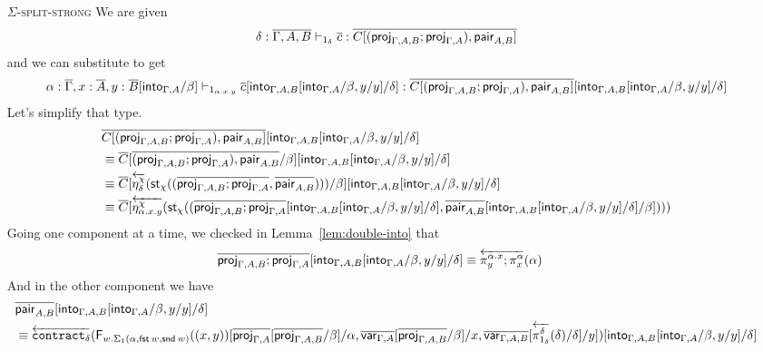 \documentclass[10pt]{article}
\theoremstyle{definition}
\newcommand\dsd[1]{\ensuremath{\mathsf{#1}}}
\newcommand{\yields}{\vdash}
\newcommand{\app}[2]{\ensuremath{#1 \: #2}}
\newcommand{\fst}[1]{\app{\dsd{fst}}{#1}}
\newcommand{\snd}[1]{\app{\dsd{snd}}{#1}}
\newcommand{\rewrite}[2]{\overleftarrow{#1}(#2)}
\newcommand\StI[2]{\ensuremath{\mathsf{st}_{#1}(#2)}}
\newcommand\FIs[2]{\ensuremath{\mathsf{F}_{#1}{(#2)}}}
\begin{document}
\begin{enumerate}[style = multiline, labelwidth = 80pt]
\item[\textsc{$\Sigma$-split-strong}] We are given
\begin{align*}
\delta : \upstairs{\Gamma, A, B} \yields_{1_\delta} \upstairs{c} :\upstairs{C[(\proj{\Gamma, A, B};\proj{\Gamma, A}), \qpair{A,B}]} 
\end{align*}
and we can substitute to get
\begin{align*}
\alpha : \upstairs{\Gamma}, x : \upstairs{A}, y : \upstairs{B}[\into{\Gamma,A}/\beta] \yields_{1_{\alpha.x.y}} \upstairs{c}[\into{\Gamma, A, B}[\into{\Gamma, A}/\beta, y/y] /\delta] : \upstairs{C[(\proj{\Gamma, A, B};\proj{\Gamma, A}), \qpair{A,B}]}[\into{\Gamma, A, B}[\into{\Gamma, A}/\beta, y/y] /\delta]
\end{align*}
Let's simplify that type.
\begin{align*}
&\upstairs{C[(\proj{\Gamma, A, B};\proj{\Gamma, A}), \qpair{A,B}]}[\into{\Gamma, A, B}[\into{\Gamma, A}/\beta, y/y] /\delta] \\
&\equiv \upstairs{C}[\upstairs{(\proj{\Gamma, A, B};\proj{\Gamma, A}), \qpair{A,B}}/\beta][\into{\Gamma, A, B}[\into{\Gamma, A}/\beta, y/y] /\delta] \\
&\equiv \upstairs{C}[\rewrite{\eta^\chi_{\delta}}{\StI{\chi}{(\upstairs{\proj{\Gamma, A, B};\proj{\Gamma, A}}, \upstairs{\qpair{A,B}})}}/\beta][\into{\Gamma, A, B}[\into{\Gamma, A}/\beta, y/y] /\delta] \\
&\equiv \upstairs{C}[\rewrite{\eta^\chi_{\alpha.x.y}}{\StI{\chi}{(\upstairs{\proj{\Gamma, A, B};\proj{\Gamma, A}}[\into{\Gamma, A, B}[\into{\Gamma, A}/\beta, y/y] /\delta], \upstairs{\qpair{A,B}}[\into{\Gamma, A, B}[\into{\Gamma, A}/\beta, y/y] /\delta]/\beta])}}
\end{align*}
Going one component at a time, we checked in Lemma~\ref{lem:double-into} that
\begin{align*}
\upstairs{\proj{\Gamma, A, B};\proj{\Gamma, A}}[\into{\Gamma, A, B}[\into{\Gamma, A}/\beta, y/y] /\delta] 
&\equiv \rewrite{\pi^{\alpha.x}_y;\pi^\alpha_x}{\alpha}
\end{align*}
And in the other component we have
\begin{align*}
&\upstairs{\qpair{A,B}}[\into{\Gamma, A, B}[\into{\Gamma, A}/\beta, y/y] /\delta] \\
&\equiv \rewrite{\contract{\delta}}{\FIs{w. \Sigma_1(\alpha,\fst w, \snd w)}{(x, y)}[\upstairs{\proj{\Gamma, A}}[\upstairs{\proj{\Gamma, A, B}}/\beta]/\alpha, \upstairs{\qvar{\Gamma, A}}[\upstairs{\proj{\Gamma, A, B}}/\beta]/x, \upstairs{\qvar{\Gamma, A, B}}[\rewrite{\pi^\delta_{1_\delta}}{\delta}/\delta]/y]}[\into{\Gamma, A, B}[\into{\Gamma, A}/\beta, y/y] /\delta] \\

\end{align*}
\end{enumerate}
\end{document}
